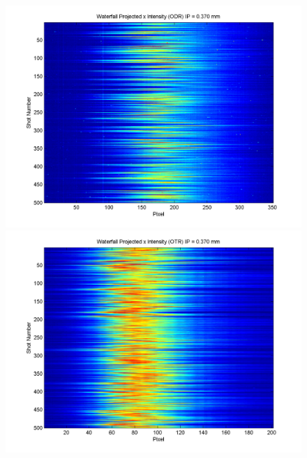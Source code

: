 \documentclass[12pt]{article}
\begin{document}
\begin{figure}
\begin{center}
\includegraphics[scale=0.5]{Figures/ProjX_wfall_ODR_370.PNG}
\includegraphics[scale=0.5]{Figures/ProjX_wfall_OTR_370.PNG}
\caption{}
\end{center}
\end{figure}
\end{document}
